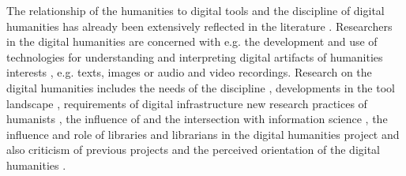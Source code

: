 \documentclass[12pt, a4paper, titlepage, oneside, abstract=true, toc=listof, toc=bibliography, BCOR=1cm]{scrreprt}
\begin{document}
The relationship of the humanities to digital tools and the discipline of digital humanities has already been extensively reflected in the literature \citep[e.g.][]{Anthony2013, Barker2012, Berry2012, Borgman2009, Brian2020, Cunningham2010, Engerer2020, Given2018, Koltay2016, McGillivray2020, Neuefeind2020, Rosenblum2016, Zundert2012}. Researchers in the digital humanities are concerned with e.g. the development and use of technologies for understanding and interpreting digital artifacts of humanities interests \citep{Given2018}, e.g. texts, images or audio and video recordings. Research on the digital humanities includes the needs of the discipline \citep{Arthur2009, Berry2012, Borgman2009, Neuefeind2020, Rosenblum2016}, developments in the tool landscape \citep{Anthony2013}, requirements of digital infrastructure \citep{Buddenbohm2017} new research practices of humanists \citep{Given2018}, the influence of and the intersection with information science \citep{Engerer2020, McGillivray2020}, the influence and role of libraries and librarians in the digital humanities project \citep{Cunningham2010, Koltay2016, Warwick2008} and also criticism of previous projects and the perceived orientation of the digital humanities \citep{Barker2012, Zundert2012}.

\end{document}
